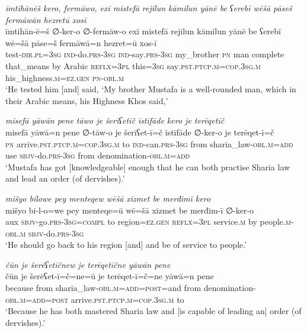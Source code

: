 \ea \label{ŽP.83}
\textit{īmtihānēš kero, fermāwo, exī mistefā rejilun kāmilun yānē be ʕerebī wēšā pāseš fermāwān hezretū xosī} \\ 
\gll īmtihān-ē=š ∅-ker-o ∅-fermāw-o exī mistefā rejilun kāmilun yānē be ʕerebī wē=šā pāse=š fermāwā=n hezret=ū xos-ī \\ 
 test\textsc{-dir}\textsc{.pl}\textsc{=3sg} \textsc{ind-}do\textsc{.prs}\textsc{-3sg} \textsc{ind-}say\textsc{.prs}\textsc{-3sg} my\_brother \textsc{pn} man complete that\_means by Arabic \textsc{reflx}\textsc{=3pl} this\textsc{=3sg} say\textsc{.pst}\textsc{.ptcp}\textsc{.m}\textsc{=cop}\textsc{.3sg}\textsc{.m} his\_highness\textsc{.m}\textsc{\textsc{=ez.gen}} \textsc{pn}\textsc{-obl}\textsc{.m} \\ 
\glt `He tested him [and] said, ‘My brother Mustafa is a well-rounded man, which in their Arabic means, his Highness Khos said,'
\z 
 
\ea \label{ŽP.84}
\textit{misefā yāwān pene tāwo je šerīʕetīč īstīfāde kero je terēqetīč} \\ 
\gll misefā yāwā=n pene ∅-tāw-o je šerīʕet-ī=č īstīfāde ∅-ker-o je terēqet-ī=č \\ 
 \textsc{pn} arrive\textsc{.pst}\textsc{.ptcp}\textsc{.m}\textsc{=cop}\textsc{.3sg}\textsc{.m} to \textsc{ind-}can\textsc{.prs}\textsc{-3sg} from sharia\_law\textsc{-obl}\textsc{.m}\textsc{=add} use \textsc{sbjv-}do\textsc{.prs}\textsc{-3sg} from denomination\textsc{-obl}\textsc{.m}\textsc{=add} \\ 
\glt `Mustafa has got [knowledgeable] enough that he can both practise Sharia law and lead an order (of dervishes).'
\z 
 
\ea \label{ŽP.87}
\textit{mišyo bilowe pey menteqew wēšā xizmet be merđimī kero} \\ 
\gll mišyo bi-l-o=we pey menteqe=ū wē=šā xizmet be merđim-ī ∅-ker-o \\ 
 aux \textsc{sbjv-}go\textsc{.prs}\textsc{-3sg}\textsc{=compl} to region\textsc{\textsc{=ez.gen}} \textsc{reflx}\textsc{=3pl} service\textsc{.m} by people\textsc{.m}\textsc{-obl}\textsc{.m} \textsc{sbjv-}do\textsc{.prs}\textsc{-3sg} \\ 
\glt `He should go back to his region [and] and be of service to people.'
\z 
 
\ea \label{ŽP.88}
\textit{čūn je šerēʕetīčnew je terēqetīčne yāwān pene} \\ 
\gll čūn je šerēʕet-ī=č=ne=ū je terēqet-ī=č=ne yāwā=n pene \\ 
 because from sharia\_law\textsc{-obl}\textsc{.m}\textsc{=add}\textsc{=\textsc{post}}=and from denomination\textsc{-obl}\textsc{.m}\textsc{=add}\textsc{=\textsc{post}} arrive\textsc{.pst}\textsc{.ptcp}\textsc{.m}\textsc{=cop}\textsc{.3sg}\textsc{.m} to \\ 
\glt `Because he has both mastered Sharia law and [is capable of leading an] order (of dervishes).'
\z 
 

